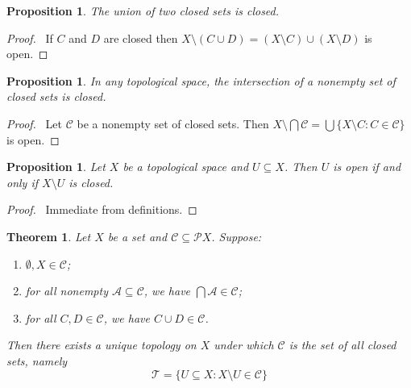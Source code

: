 \documentclass{report}
\let\qed\relax
\newtheorem{prop}[lm]{Proposition}
\newtheorem{thm}[lm]{Theorem}
\theoremstyle{definition}
\begin{document}
  \begin{prop}
    \label{prop:topology:closed:union}
    The union of two closed sets is closed.
  \end{prop}

  \begin{proof}
    \pf\ If $C$ and $D$ are closed then $X \setminus (C \cup D) = (X \setminus
    C) \cup (X \setminus D)$ is open. \qed
  \end{proof}

  \begin{prop}
    \label{prop:topology:closed:intersection}
    In any topological space, the intersection of a nonempty set of closed sets
    is closed.
  \end{prop}

  \begin{proof}
    \pf\ Let $\mathcal{C}$ be a nonempty set of closed sets. Then $X \setminus
    \bigcap \mathcal{C} = \bigcup \{ X \setminus C : C \in \mathcal{C} \}$ is
    open. \qed
  \end{proof}

  \begin{prop}
    \label{prop:topology:closed:open}
    Let $X$ be a topological space and $U \subseteq X$. Then $U$ is open if and
    only if $X \setminus U$ is closed.
  \end{prop}

  \begin{proof}
    \pf\ Immediate from definitions.
  \end{proof}

  \begin{thm}
    \label{thm:topology:closed}
    Let $X$ be a set and $\mathcal{C} \subseteq \mathcal{P} X$. Suppose:
    \begin{enumerate}
      \item $\emptyset, X \in \mathcal{C}$;
      \item for all nonempty $\mathcal{A} \subseteq \mathcal{C}$, we have
      $\bigcap
      \mathcal{A} \in \mathcal{C}$;
      \item for all $C, D \in \mathcal{C}$, we have $C \cup D \in \mathcal{C}$.
    \end{enumerate}
    Then there exists a unique topology on $X$ under which $\mathcal{C}$ is the
    set of all closed sets, namely
    \[ \mathcal{T} = \{ U \subseteq X : X \setminus U \in \mathcal{C} \} \]
  \end{thm}
\end{document}
